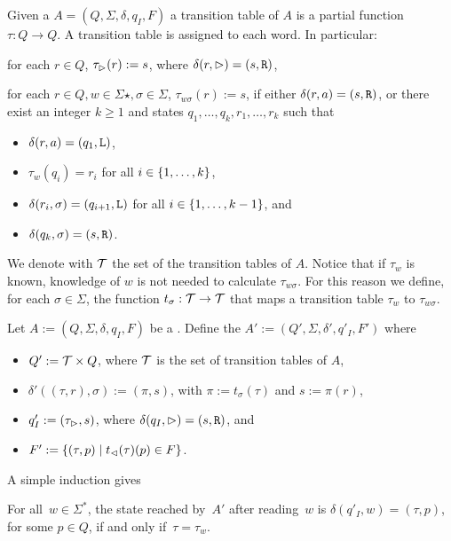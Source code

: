 \begin{defn}
	Given a \TDFA $A=(Q,\Sigma,\delta,q_I,F)$ a transition table of $A$ is a partial function $\tau:Q\to Q$.
	A transition table is assigned to each word. In particular:
	\begin{rules}
		\item for each $r\in Q$, $\tau_\rhd(r):=s$, where $\delta(r,\rhd)=(s,\mathtt R)$,
		\item for each $r\in Q,w\in\Sigma\star,\sigma\in\Sigma$, $\tau_{w\sigma}(r):=s$, if either $\delta(r,a)=(s,\mathtt R)$, or there exist an integer $k\ge1$ and states $q_1,\dots,q_k,r_1,\dots,r_k$ such that
		\begin{itemize}
			\item $\delta(r,a)=(q_1,\mathtt L)$,
			\item $\tau_w(q_i)=r_i$ for all $i\in\{1,\dots,k\}$,
			\item $\delta(r_i,\sigma)=(q_{i+1},\mathtt L)$ for all $i\in\{1,\dots,k-1\}$, and
			\item $\delta(q_k,\sigma)=(s,\mathtt R)$.
		\end{itemize}
	\end{rules}
	We denote with $\mathcal T$ the set of the transition tables of $A$.
	Notice that if $\tau_w$ is known, knowledge of $w$ is not needed to calculate $\tau_{w\sigma}$.
	For this reason we define, for each $\sigma\in\Sigma$, the function $t_\sigma:\mathcal T\to\mathcal T$ that maps a transition table $\tau_w$ to $\tau_{w\sigma}$.
\end{defn}



Let $A:=(Q,\Sigma,\delta,q_I,F)$ be a \TDFA.
Define the \DFA $A':=(Q',\Sigma,\delta',q'_I,F')$ where
\begin{itemize}
	\item $Q':=\mathcal T\times Q$, where $\mathcal T$ is the set of transition tables of $A$,
	\item $\delta'((\tau,r),\sigma):=(\pi,s)$, with $\pi:=t_\sigma(\tau)$ and $s:=\pi(r)$,
	\item $q'_I:=(\tau_\rhd,s)$, where $\delta(q_I,\rhd)=(s,\mathtt R)$, and
	\item $F':=\{(\tau,p)\mid t_\lhd(\tau)(p)\in F\}$.
\end{itemize}

A simple induction gives
\begin{lemm}
	For all~$w \in \Sigma^*$, the state reached by~$A'$ after reading~$w$ is $\delta(q'_I,w) = (\tau,p)$, for some $p\in Q$, if and only if~$\tau = \tau_w$.
\end{lemm}

